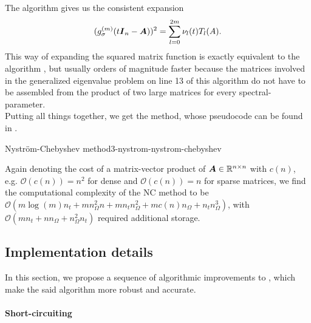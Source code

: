 The algorithm gives us the consistent expansion
\begin{equation}
    (g_{\sigma}^{(m)}(t\boldsymbol{I}_n - \boldsymbol{A}))^2 = \sum_{l=0}^{2m} \nu_l(t) T_l(A).
    \label{equ:3-nystrom-consistent-chebyshev-expansion}
\end{equation}
This way of expanding the squared matrix function
is exactly equivalent to the 
algorithm \cite[algorithm~5]{lin2017randomized}, but
usually orders of magnitude faster because the matrices involved in the
generalized eigenvalue problem
on line 13 of this algorithm do not have to be assembled from the
product of two large matrices for every \gls{spectral-parameter}.\\


Putting all things together, we get the  method, whose pseudocode
can be found in .
\begin{algo}{Nystr\"om-Chebyshev method}{3-nystrom-nystrom-chebyshev}
    
\end{algo}

Again denoting the cost of a matrix-vector product of $\boldsymbol{A} \in \mathbb{R}^{n \times n}$
with $c(n)$, e.g. $\mathcal{O}(c(n)) = n^2$ for dense and $\mathcal{O}(c(n)) = n$
for sparse matrices, we find the computational complexity of the \gls{NC}
method to be $\mathcal{O}(m \log(m) n_t + m n_{\Omega}^2 n + m n_t n_{\Omega}^2 +  m c(n) n_{\Omega} + n_t n_{\Omega}^3)$, with
$\mathcal{O}(m n_t + n n_{\Omega} + n_{\Omega}^2 n_t)$ required additional storage.


\subsection{Implementation details}
\label{subsec:3-nystrom-implementation-details}

In this section, we propose a sequence of algorithmic improvements to
, which make the said algorithm more
robust and accurate.

\paragraph{Short-circuiting}

